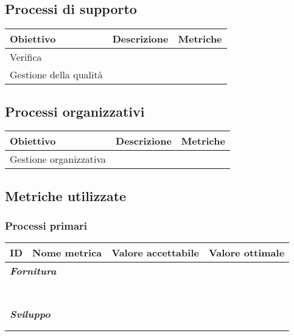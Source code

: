 \documentclass[10pt, a4paper]{article}
\begin{document}
\subsection{Processi di supporto}
    {\renewcommand{\arraystretch}{1.5}
    \begin{tabularx}{\textwidth}{p{}|p{}|X}
    \textbf{Obiettivo} & \textbf{Descrizione} & \textbf{Metriche}  \\
    \hline
    Verifica &  &  \\
    \hline
    Gestione della qualità &  &  \\
    \end{tabularx}}
    
\subsection{Processi organizzativi}
    {\renewcommand{\arraystretch}{1.5}
    \begin{tabularx}{\textwidth}{p{}|p{}|X}
    \textbf{Obiettivo} & \textbf{Descrizione} & \textbf{Metriche}  \\
    \hline
    Gestione organizzativa &  &  \\
    \end{tabularx}}
    
\subsection{Metriche utilizzate}
\subsubsection{Processi primari}
    {\renewcommand{\arraystretch}{1.5}
    \begin{tabularx}{\textwidth}{p{}|p{}|X|X}
    \textbf{ID} & \textbf{Nome metrica} & \textbf{Valore accettabile} & \textbf{Valore ottimale}  \\
    \hline
    \multicolumn{4}{l}{\cellcolor{primarycolor}\textbf{\textit{Fornitura}}} \\
    \hline
     &  &  &  \\
    \hline
     &  &  &  \\
    \hline
     &  &  &  \\
    \hline
     &  &  &  \\
    \hline
     &  &  &  \\
    \hline
     &  &  &  \\
    \hline
     &  &  &  \\
    \hline
    \multicolumn{4}{l}{\cellcolor{primarycolor}\textbf{\textit{Sviluppo}}} \\
    \hline
     &  &  &  \\
    \hline
     &  &  &  \\
    \end{tabularx}}
   
\end{document}
